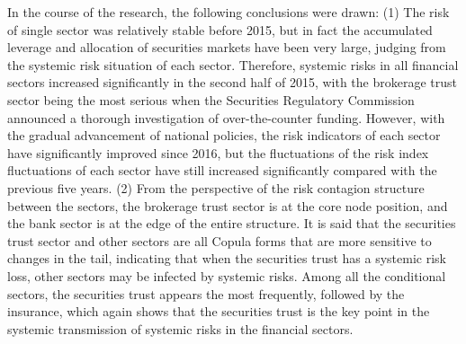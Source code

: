 \begin{eabstract}
  In the course of the research, the following conclusions were drawn: (1) The
  risk of single sector was relatively stable before 2015, but in fact the
  accumulated leverage and allocation of securities markets have been very
  large, judging from the systemic risk situation of each sector. Therefore,
  systemic risks in all financial sectors increased significantly in the second
  half of 2015, with the brokerage trust sector being the most serious when the
  Securities Regulatory Commission announced a thorough investigation of
  over-the-counter funding. However, with the gradual advancement of national
  policies, the risk indicators of each sector have significantly improved since
  2016, but the fluctuations of the risk index fluctuations of each sector have
  still increased significantly compared with the previous five years. (2) From
  the perspective of the risk contagion structure between the sectors, the
  brokerage trust sector is at the core node position, and the bank sector is at
  the edge of the entire structure. It is said that the securities trust sector
  and other sectors are all Copula forms that are more sensitive to changes in
  the tail, indicating that when the securities trust has a systemic risk loss,
  other sectors may be infected by systemic risks. Among all the conditional
  sectors, the securities trust appears the most frequently, followed by the
  insurance, which again shows that the securities trust is the key point in the
  systemic transmission of systemic risks in the financial sectors.


\end{eabstract}

